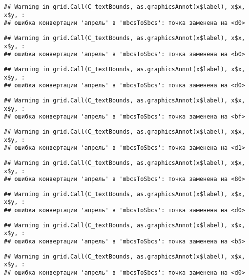 \documentclass[
]{article}
\begin{document}
\begin{verbatim}
## Warning in grid.Call(C_textBounds, as.graphicsAnnot(x$label), x$x, x$y, :
## ошибка конвертации 'апрель' в 'mbcsToSbcs': точка заменена на <d0>
\end{verbatim}

\begin{verbatim}
## Warning in grid.Call(C_textBounds, as.graphicsAnnot(x$label), x$x, x$y, :
## ошибка конвертации 'апрель' в 'mbcsToSbcs': точка заменена на <b0>
\end{verbatim}

\begin{verbatim}
## Warning in grid.Call(C_textBounds, as.graphicsAnnot(x$label), x$x, x$y, :
## ошибка конвертации 'апрель' в 'mbcsToSbcs': точка заменена на <d0>
\end{verbatim}

\begin{verbatim}
## Warning in grid.Call(C_textBounds, as.graphicsAnnot(x$label), x$x, x$y, :
## ошибка конвертации 'апрель' в 'mbcsToSbcs': точка заменена на <bf>
\end{verbatim}

\begin{verbatim}
## Warning in grid.Call(C_textBounds, as.graphicsAnnot(x$label), x$x, x$y, :
## ошибка конвертации 'апрель' в 'mbcsToSbcs': точка заменена на <d1>
\end{verbatim}

\begin{verbatim}
## Warning in grid.Call(C_textBounds, as.graphicsAnnot(x$label), x$x, x$y, :
## ошибка конвертации 'апрель' в 'mbcsToSbcs': точка заменена на <80>
\end{verbatim}

\begin{verbatim}
## Warning in grid.Call(C_textBounds, as.graphicsAnnot(x$label), x$x, x$y, :
## ошибка конвертации 'апрель' в 'mbcsToSbcs': точка заменена на <d0>
\end{verbatim}

\begin{verbatim}
## Warning in grid.Call(C_textBounds, as.graphicsAnnot(x$label), x$x, x$y, :
## ошибка конвертации 'апрель' в 'mbcsToSbcs': точка заменена на <b5>
\end{verbatim}

\begin{verbatim}
## Warning in grid.Call(C_textBounds, as.graphicsAnnot(x$label), x$x, x$y, :
## ошибка конвертации 'апрель' в 'mbcsToSbcs': точка заменена на <d0>
\end{verbatim}
\end{document}
